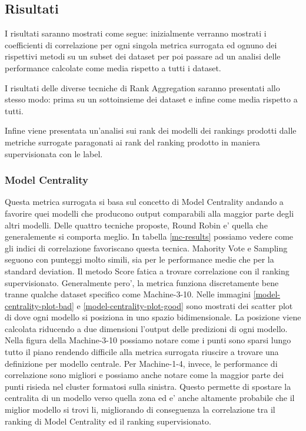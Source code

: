 \subsection{Risultati}
I risultati saranno mostrati come segue: inizialmente verranno mostrati i coefficienti di correlazione per ogni singola metrica surrogata ed ognuno dei rispettivi metodi su un subset dei dataset per poi passare ad un analisi delle performance calcolate come media rispetto a tutti i dataset.

I risultati delle diverse tecniche di Rank Aggregation saranno presentati allo stesso modo: prima su un sottoinsieme dei dataset e infine come media rispetto a tutti.

Infine viene presentata un'analisi sui rank dei modelli dei rankings prodotti dalle metriche surrogate paragonati ai rank del ranking prodotto in maniera supervisionata con le label.
\subsubsection{Model Centrality}
Questa metrica surrogata si basa sul concetto di Model Centrality andando a favorire quei modelli che producono output comparabili alla maggior parte degli altri modelli. Delle quattro tecniche proposte, Round Robin e' quella che generalemente si comporta meglio. In tabella \ref{mc-results} possiamo vedere come gli indici di correlazione favoriscano questa tecnica.
Mahority Vote e Sampling seguono con punteggi molto simili, sia per le performance medie che per la standard deviation. Il metodo Score fatica a trovare correlazione con il ranking supervisionato. 
Generalmente pero', la metrica funziona discretamente bene tranne qualche dataset specifico come Machine-3-10.  Nelle immagini \ref{model-centrality-plot-bad} e \ref{model-centrality-plot-good} sono mostrati dei scatter plot di dove ogni modello si posiziona in uno spazio bidimensionale. La posizione viene calcolata riducendo a due dimensioni l'output delle predizioni di ogni modello.  Nella figura della Machine-3-10 possiamo notare come i punti sono sparsi lungo tutto il piano rendendo difficile alla metrica surrogata riuscire a trovare una definizione per modello centrale.
Per Machine-1-4, invece, le performance di correlazione sono migliori e possiamo anche notare come la maggior parte dei punti risieda nel cluster formatosi sulla sinistra. Questo permette di spostare la centralita di un modello verso quella zona ed e' anche altamente probabile che il miglior modello si trovi li, migliorando di conseguenza la correlazione tra il ranking di Model Centrality ed il ranking supervisionato.


